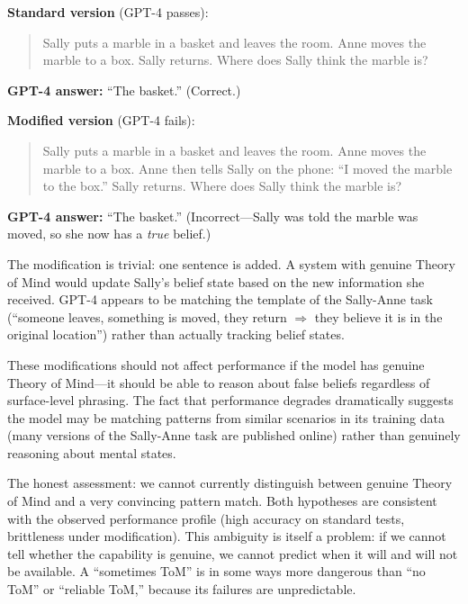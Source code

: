 \documentclass[11pt, a4paper]{article}
\begin{document}
\begin{example}[title={Ullman's Adversarial ToM Modification}]
\textbf{Standard version} (GPT-4 passes):
\begin{quote}
Sally puts a marble in a basket and leaves the room. Anne moves the marble to a box. Sally returns. Where does Sally think the marble is?
\end{quote}
\textbf{GPT-4 answer:} ``The basket.'' (Correct.)

\medskip
\textbf{Modified version} (GPT-4 fails):
\begin{quote}
Sally puts a marble in a basket and leaves the room. Anne moves the marble to a box. Anne then tells Sally on the phone: ``I moved the marble to the box.'' Sally returns. Where does Sally think the marble is?
\end{quote}
\textbf{GPT-4 answer:} ``The basket.'' (Incorrect---Sally was told the marble was moved, so she now has a \emph{true} belief.)

The modification is trivial: one sentence is added. A system with genuine Theory of Mind would update Sally's belief state based on the new information she received. GPT-4 appears to be matching the template of the Sally-Anne task (``someone leaves, something is moved, they return $\Rightarrow$ they believe it is in the original location'') rather than actually tracking belief states.
\end{example}

These modifications should not affect performance if the model has genuine Theory of Mind---it should be able to reason about false beliefs regardless of surface-level phrasing. The fact that performance degrades dramatically suggests the model may be matching patterns from similar scenarios in its training data (many versions of the Sally-Anne task are published online) rather than genuinely reasoning about mental states.

\begin{calibration}
The honest assessment: we cannot currently distinguish between genuine Theory of Mind and a very convincing pattern match. Both hypotheses are consistent with the observed performance profile (high accuracy on standard tests, brittleness under modification). This ambiguity is itself a problem: if we cannot tell whether the capability is genuine, we cannot predict when it will and will not be available. A ``sometimes ToM'' is in some ways more dangerous than ``no ToM'' or ``reliable ToM,'' because its failures are unpredictable.
\end{calibration}
\end{document}
